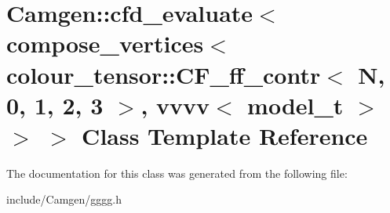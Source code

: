 \hypertarget{a00046}{}\section{Camgen\+:\+:cfd\+\_\+evaluate$<$ compose\+\_\+vertices$<$ colour\+\_\+tensor\+:\+:C\+F\+\_\+ff\+\_\+contr$<$ N, 0, 1, 2, 3 $>$, vvvv$<$ model\+\_\+t $>$ $>$ $>$ Class Template Reference}
\label{a00046}


The documentation for this class was generated from the following file\+:\begin{DoxyCompactItemize}
\item 
include/\+Camgen/gggg.\+h\end{DoxyCompactItemize}
